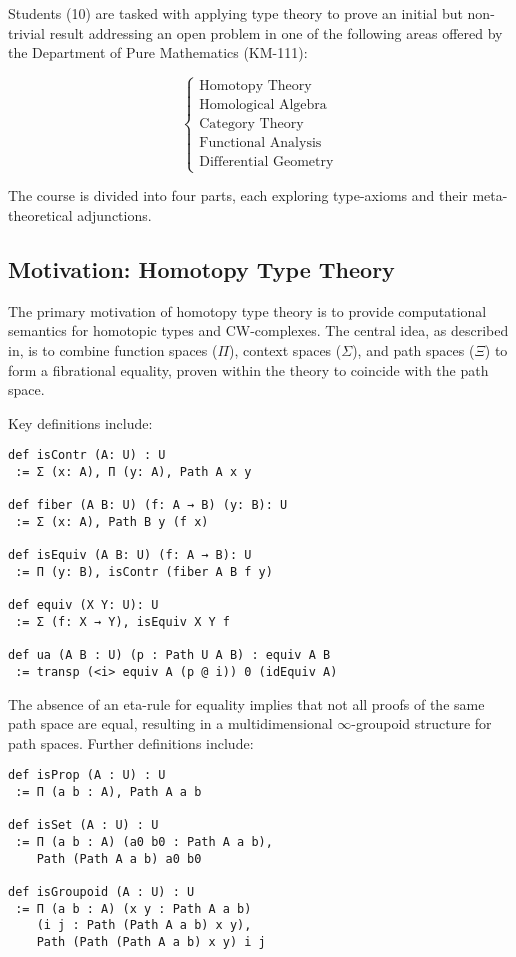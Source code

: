 \documentclass{article}
\begin{document}
Students (10) are tasked with applying type theory to prove an initial
but non-trivial result addressing an open problem in one of the following
areas offered by the Department of Pure Mathematics (KM-111):

\[
\begin{cases}
\text{Homotopy Theory} \\
\text{Homological Algebra} \\
\text{Category Theory} \\
\text{Functional Analysis} \\
\text{Differential Geometry}
\end{cases}
\]

The course is divided into four parts, each exploring type-axioms and their meta-theoretical adjunctions.

\newpage
\subsection{Motivation: Homotopy Type Theory}
The primary motivation of homotopy type theory is to provide computational
semantics for homotopic types and CW-complexes. The central idea, as
described in, is to combine function spaces (\(\Pi\)),
context spaces (\(\Sigma\)), and path spaces (\(\Xi\)) to form a fibrational
equality, proven within the theory to coincide with the path space.

Key definitions include:

\begin{lstlisting}
def isContr (A: U) : U
 := Σ (x: A), Π (y: A), Path A x y

def fiber (A B: U) (f: A → B) (y: B): U
 := Σ (x: A), Path B y (f x)

def isEquiv (A B: U) (f: A → B): U
 := Π (y: B), isContr (fiber A B f y)

def equiv (X Y: U): U
 := Σ (f: X → Y), isEquiv X Y f

def ua (A B : U) (p : Path U A B) : equiv A B
 := transp (<i> equiv A (p @ i)) 0 (idEquiv A)
\end{lstlisting}

The absence of an eta-rule for equality implies that not all proofs of the
same path space are equal, resulting in a multidimensional \(\infty\)-groupoid
structure for path spaces. Further definitions include:

\begin{lstlisting}
def isProp (A : U) : U
 := Π (a b : A), Path A a b

def isSet (A : U) : U
 := Π (a b : A) (a0 b0 : Path A a b),
    Path (Path A a b) a0 b0

def isGroupoid (A : U) : U
 := Π (a b : A) (x y : Path A a b)
    (i j : Path (Path A a b) x y),
    Path (Path (Path A a b) x y) i j
\end{lstlisting}
\end{document}
